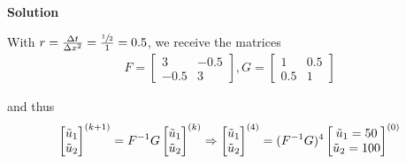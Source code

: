\textbf{Solution}

With $r = \frac{\Delta t}{\Delta x^2} = \frac{\sfrac{1}{2}}{1} = 0.5$, we receive the matrices
\begin{align*}
	F = \begin{bmatrix}
		3 & -0.5 \\
		-0.5 & 3
	\end{bmatrix},
	G = \begin{bmatrix}
		1 & 0.5 \\
		0.5 & 1
	\end{bmatrix}
\end{align*}

and thus
\begin{align*}
	\begin{bmatrix}
		\tilde{u}_1 \\
		\tilde{u}_2
	\end{bmatrix}^{(k+1)}
	=
	F^{-1} G
	\begin{bmatrix}
		\tilde{u}_1 \\
		\tilde{u}_2
	\end{bmatrix}^{(k)}
	\Rightarrow
	\begin{bmatrix}
		\tilde{u}_1 \\
		\tilde{u}_2
	\end{bmatrix}^{(4)}
	=
	(F^{-1} G)^4
	\begin{bmatrix}
		\tilde{u}_1 = 50 \\
		\tilde{u}_2 = 100
	\end{bmatrix}^{(0)}
\end{align*}






